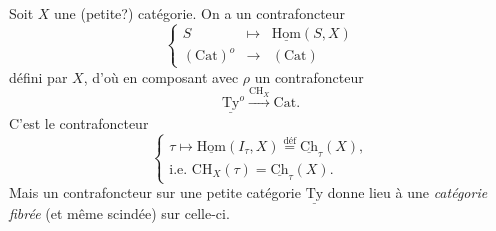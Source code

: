 \documentclass[11pt]{article}
\newcommand{\uHom}{\underline{\mathrm{Hom}}}
\newcommand{\uCh}{\underline{\mathrm{Ch}}}
\newcommand{\uTy}{\underline{\mathrm{Ty}}}
\newcommand{\Cat}{\mathrm{Cat}}
\begin{document}
Soit $X$ une (petite?) catégorie. On a un contrafoncteur
\[
\left\{
\begin{array}{rcl}
S & \longmapsto & \uHom(S,X)\\[1ex]
(\Cat)^o & \longrightarrow & (\Cat)
\end{array}
\right.
\]
défini par $X$, d'où en composant avec $\rho$ un contrafoncteur
\[
\uTy^{o} \xrightarrow{\mathrm{CH}_X} \Cat.
\]
C'est le contrafoncteur
\[
\left\{
\begin{array}{l}
\tau \longmapsto \uHom(I_\tau,X) \overset{\text{déf}}{=} \uCh_\tau(X),\\[1ex]
\text{i.e. } \mathrm{CH}_X(\tau)=\uCh_\tau(X).
\end{array}
\right.
\]
Mais un contrafoncteur sur une petite catégorie $\uTy$ donne lieu à une \textit{catégorie fibrée} (et même scindée) sur celle-ci.
\end{document}
